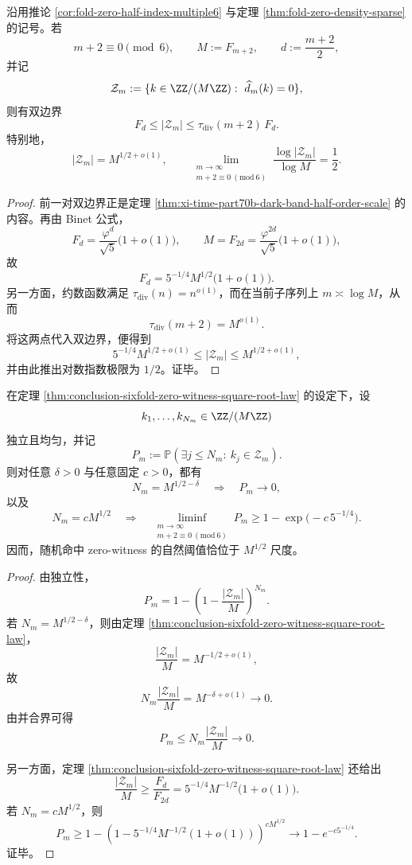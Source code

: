 \begin{theorem}[六倍窗零见证的平方根律]\label{thm:conclusion-sixfold-zero-witness-square-root-law}
沿用推论 \ref{cor:fold-zero-half-index-multiple6} 与定理 \ref{thm:fold-zero-density-sparse} 的记号。若
\[
m+2\equiv 0\pmod 6,
\qquad
M:=F_{m+2},
\qquad
d:=\frac{m+2}{2},
\]
并记
\[
\mathcal Z_m:=\{k\in \ZZ/(M\ZZ):\ \widehat d_m(k)=0\},
\]
则有双边界
\[
F_d\le |\mathcal Z_m|\le \tau_{\mathrm{div}}(m+2)\,F_d.
\]
特别地，
\[
|\mathcal Z_m|=M^{1/2+o(1)},
\qquad
\lim_{\substack{m\to\infty\\ m+2\equiv 0\ (\mathrm{mod}\ 6)}}
\frac{\log |\mathcal Z_m|}{\log M}
=
\frac12.
\]
\end{theorem}
\begin{proof}
前一对双边界正是定理 \ref{thm:xi-time-part70b-dark-band-half-order-scale} 的内容。再由 Binet 公式，
\[
F_d=\frac{\varphi^d}{\sqrt5}\bigl(1+o(1)\bigr),
\qquad
M=F_{2d}=\frac{\varphi^{2d}}{\sqrt5}\bigl(1+o(1)\bigr),
\]
故
\[
F_d=5^{-1/4}M^{1/2}\bigl(1+o(1)\bigr).
\]
另一方面，约数函数满足 \(\tau_{\mathrm{div}}(n)=n^{o(1)}\)，而在当前子序列上 \(m\asymp \log M\)，从而
\[
\tau_{\mathrm{div}}(m+2)=M^{o(1)}.
\]
将这两点代入双边界，便得到
\[
5^{-1/4}M^{1/2+o(1)}
\le
|\mathcal Z_m|
\le
M^{1/2+o(1)},
\]
并由此推出对数指数极限为 \(1/2\)。证毕。
\end{proof}

\begin{theorem}[次平方根随机谱探测的失效律]\label{thm:conclusion-sixfold-zero-witness-subsqrt-probing-failure}
在定理 \ref{thm:conclusion-sixfold-zero-witness-square-root-law} 的设定下，设
\[
k_1,\dots,k_{N_m}\in \ZZ/(M\ZZ)
\]
独立且均匀，并记
\[
P_m:=\mathbb P\!\left(\exists j\le N_m:\ k_j\in \mathcal Z_m\right).
\]
则对任意 \(\delta>0\) 与任意固定 \(c>0\)，都有
\[
N_m=M^{1/2-\delta}
\quad\Longrightarrow\quad
P_m\to 0,
\]
以及
\[
N_m=cM^{1/2}
\quad\Longrightarrow\quad
\liminf_{\substack{m\to\infty\\ m+2\equiv 0\ (\mathrm{mod}\ 6)}}P_m
\ge
1-\exp\!\bigl(-c\,5^{-1/4}\bigr).
\]
因而，随机命中 zero-witness 的自然阈值恰位于 \(M^{1/2}\) 尺度。
\end{theorem}
\begin{proof}
由独立性，
\[
P_m
=
1-\left(1-\frac{|\mathcal Z_m|}{M}\right)^{N_m}.
\]
若 \(N_m=M^{1/2-\delta}\)，则由定理 \ref{thm:conclusion-sixfold-zero-witness-square-root-law}，
\[
\frac{|\mathcal Z_m|}{M}
=
M^{-1/2+o(1)},
\]
故
\[
N_m\frac{|\mathcal Z_m|}{M}
=
M^{-\delta+o(1)}
\to 0.
\]
由并合界可得
\[
P_m\le N_m\frac{|\mathcal Z_m|}{M}\to 0.
\]

另一方面，定理 \ref{thm:conclusion-sixfold-zero-witness-square-root-law} 还给出
\[
\frac{|\mathcal Z_m|}{M}
\ge
\frac{F_d}{F_{2d}}
=
5^{-1/4}M^{-1/2}\bigl(1+o(1)\bigr).
\]
若 \(N_m=cM^{1/2}\)，则
\[
P_m
\ge
1-\left(1-5^{-1/4}M^{-1/2}(1+o(1))\right)^{cM^{1/2}}
\longrightarrow
1-e^{-c5^{-1/4}}.
\]
证毕。
\end{proof}

